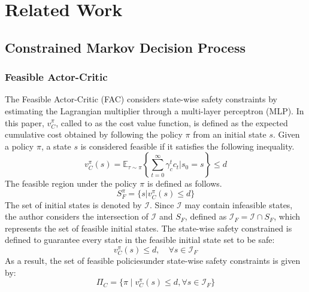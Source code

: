 

\section{Related Work}

\subsection{Constrained Markov Decision Process}

\subsubsection{Feasible Actor-Critic}
The Feasible Actor-Critic (FAC) \cite{Haitong:2021} considers state-wise safety constraints by estimating the Lagrangian multiplier through a multi-layer perceptron (MLP).
In this paper, $v^\pi_C$, called to as the cost value function, is defined as the expected cumulative cost obtained by following the policy $\pi$ from an initial state $s$.
Given a policy $\pi$, a state $s$ is considered feasible if it satisfies the following inequality.
\begin{equation}
    v^\pi_C(s) = 
    \mathbb{E}_{\tau \sim \pi} \left\{\sum^\infty_{t = 0} \gamma^t_c c_t | s_0 = s \right\} \leq d
\end{equation}
The feasible region under the policy $\pi$ is defined as follows.
\begin{equation}
    S^\pi_F = \{
        s | v^\pi_C(s) \leq d
    \}
\end{equation}
The set of initial states is denoted by $\mathcal{I}$.
Since $\mathcal{I}$ may contain infeasible states, the author considers the intersection of $\mathcal{I}$ and $S_F$, defined as $\mathcal{I}_F = \mathcal{I} \cap S_F$, which represents the set of feasible initial states.
The state-wise safety constrained is defined to guarantee every state in the feasible initial state set to be safe:
\begin{equation}
    v^\pi_C(s) \leq d, \quad \forall s \in \mathcal{I}_F
\end{equation}
As a result, the set of feasible policies\footnotemark under state-wise safety constraints is given by:
\begin{equation}
    \Pi_C = \{
        \pi \mid v^\pi_C(s) \leq d,
        \forall s \in \mathcal{I}_F
    \}
\end{equation}

